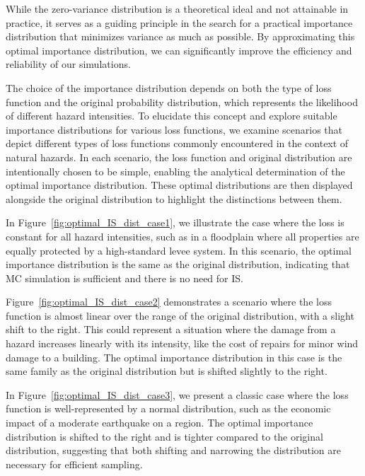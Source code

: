         While the zero-variance distribution is a theoretical ideal and not attainable in practice, it serves as a guiding principle in the search for a practical importance distribution that minimizes variance as much as possible. By approximating this optimal importance distribution, we can significantly improve the efficiency and reliability of our simulations.

        The choice of the importance distribution depends on both the type of loss function and the original probability distribution, which represents the likelihood of different hazard intensities. To elucidate this concept and explore suitable importance distributions for various loss functions, we examine scenarios that depict different types of loss functions commonly encountered in the context of natural hazards. In each scenario, the loss function and original distribution are intentionally chosen to be simple, enabling the analytical determination of the optimal importance distribution. These optimal distributions are then displayed alongside the original distribution to highlight the distinctions between them.

        
        
        In Figure~\ref{fig:optimal_IS_dist_case1}, we illustrate the case where the loss is constant for all hazard intensities, such as in a floodplain where all properties are equally protected by a high-standard levee system. In this scenario, the optimal importance distribution is the same as the original distribution, indicating that MC simulation is sufficient and there is no need for IS.

        
        
        Figure~\ref{fig:optimal_IS_dist_case2} demonstrates a scenario where the loss function is almost linear over the range of the original distribution, with a slight shift to the right. This could represent a situation where the damage from a hazard increases linearly with its intensity, like the cost of repairs for minor wind damage to a building. The optimal importance distribution in this case is the same family as the original distribution but is shifted slightly to the right.

        
        
        In Figure~\ref{fig:optimal_IS_dist_case3}, we present a classic case where the loss function is well-represented by a normal distribution, such as the economic impact of a moderate earthquake on a region. The optimal importance distribution is shifted to the right and is tighter compared to the original distribution, suggesting that both shifting and narrowing the distribution are necessary for efficient sampling.

